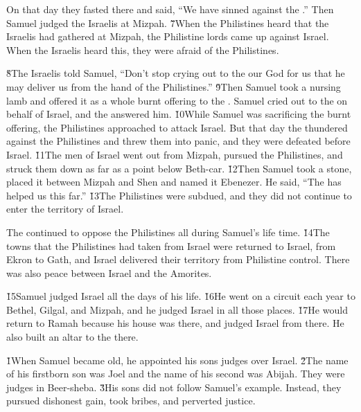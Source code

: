 On that day they fasted there and said, ``We have sinned against the .'' Then Samuel judged the Israelis at Mizpah. \v{7}When the Philistines heard that the Israelis had gathered at Mizpah, the Philistine lords came up against Israel. When the Israelis heard this, they were afraid of the Philistines.

\v{8}The Israelis told Samuel, ``Don't stop crying out to the  our God for us that he may deliver us from the hand of the Philistines.'' \v{9}Then Samuel took a nursing lamb and offered it as a whole burnt offering to the . Samuel cried out to the  on behalf of Israel, and the  answered him. \v{10}While Samuel was sacrificing the burnt offering, the Philistines approached to attack Israel. But that day the  thundered against the Philistines and threw them into panic, and they were defeated before Israel. \v{11}The men of Israel went out from Mizpah, pursued the Philistines, and struck them down as far as a point below Beth-car. \v{12}Then Samuel took a stone, placed it between Mizpah and Shen and named it Ebenezer. He said, ``The  has helped us this far.'' \v{13}The Philistines were subdued, and they did not continue to enter the territory of Israel.

The  continued to oppose the Philistines all during Samuel's life time. \v{14}The towns that the Philistines had taken from Israel were returned to Israel, from Ekron to Gath, and Israel delivered their territory from Philistine control. There was also peace between Israel and the Amorites.

\v{15}Samuel judged Israel all the days of his life. \v{16}He went on a circuit each year to Bethel, Gilgal, and Mizpah, and he judged Israel in all those places. \v{17}He would return to Ramah because his house was there, and judged Israel from there. He also built an altar to the  there.

\v{1}When Samuel became old, he appointed his sons judges over Israel. \v{2}The name of his firstborn son was Joel and the name of his second was Abijah. They were judges in Beer-sheba. \v{3}His sons did not follow Samuel's example. Instead, they pursued dishonest gain, took bribes, and perverted justice.

